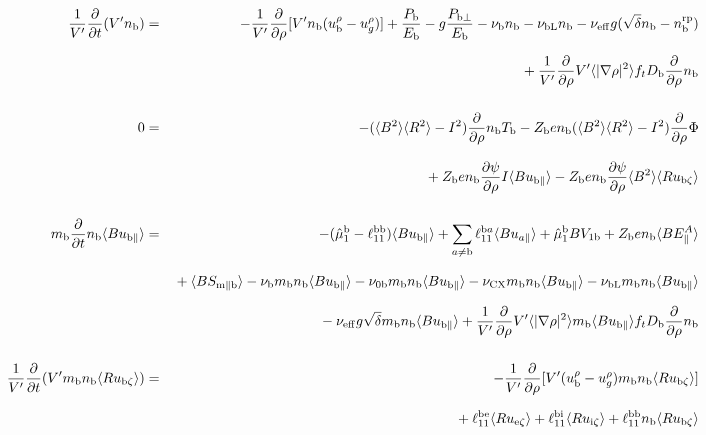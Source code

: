 \documentclass[11pt]{article}
\def\r#1{{\rm#1}}
\def\aves#1{\langle#1\rangle}
\def\dd#1#2{\frac{\partial #1}{\partial #2}}
\def\para{\parallel}
\def\ddrho{\frac{\partial}{\partial\rho}}
\def\ddV{\frac{\partial}{\partial V}}
\def\mb{m_\r{b}}
\def\ni{n_\r{i}}
\def\nb{n_\r{b}}
\def\Tb{T_\r{b}}
\def\Zb{Z_\r{b}}
\def\Pb{P_\r{b}}
\def\Eb{E_\r{b}}
\def\uezt{u_{\r{e}\zeta}}
\def\uizt{u_{\r{i}\zeta}}
\def\ubzt{u_{\r{b}\zeta}}
\def\ubpara{u_{\r{b}\para}}
\def\qhatepara{\hat{q}_{\r{e}\para}}
\def\qhatipara{\hat{q}_{\r{i}\para}}
\def\ubrho{u_\r{b}^\rho}
\def\ugrho{u_{g}^\rho}
\def\bri{\aves{B^2}\aves{R^2} - I^2}
\def\ddt{\frac{\partial}{\partial t}}
\def\nbrp{n_\r{b}^\r{rp}}
\def\Pbpara{P_{\r{b}\parallel}}
\def\Pbperp{P_{\r{b}\perp}}
\def\nueff{\nu_\r{eff}}
\def\Db{D_\r{b}}
\def\nunb{\nu_\r{0b}}
\def\nuCX{\nu_\r{CX}}
\def\nub{\nu_\r{b}}
\def\nubL{\nu_\r{bL}}
\def\red#1{\textcolor{red}{#1}}
\begin{document}
%
\begin{eqnarray}
  \frac{1}{V'} \ddt (V' \nb) &=&
%
  - \frac{1}{V'} \ddrho [ V' \nb (\ubrho - \ugrho) ]
%
  + \frac{\Pb}{\Eb}
%
  - g \frac{\Pbperp}{\Eb}
%
  - \nub \nb
%
  - \nubL \nb
%
  - \nueff g (\sqrt{\delta} \nb - \nbrp)
%
\nonumber\\[2.5mm]&&{}
  + \frac{1}{V'} \ddrho V'\aves{|\nabla\rho|^2} f_t \Db \ddrho \nb
%
\\[5mm]
  0 &=&
%
  -           ( \bri ) \ddrho \nb \Tb
%
  - \Zb e \nb ( \bri ) \ddrho \Phi
\nonumber\\[3mm]&&{}
%
  + \Zb e \nb \dd{\psi}{\rho} I          \aves{B\ubpara}
%
  - \Zb e \nb \dd{\psi}{\rho} \aves{B^2} \aves{R\ubzt}
\\[5mm]
  \mb \ddt \nb \aves{B \ubpara} &=&
%
  - (\hat{\mu}_1^\r{b} - \ell_{11}^\r{bb}) \aves{B \ubpara}
%
  + \sum_{a\neq\r{b}} \ell_{11}^{\r{b}a} \aves{B u_{a\para}}
%
  + \hat{\mu}_1^\r{b} {B V_{1\r{b}}}
%
  + \Zb e \nb \aves{B E_\para^A}
\nonumber\\[2.5mm]&&{}
%
  + \aves{B S_{\r{m}\para\r{b}}}
%
  - \nub  \mb \nb \aves{B\ubpara}
%
  - \nunb \mb \nb \aves{B\ubpara}
%
  - \nuCX \mb \nb \aves{B\ubpara}
%
%
  - \nubL \mb \nb \aves{B\ubpara}
%
\nonumber\\[2.5mm]&&{}
  - \nueff g \sqrt{\delta} \mb \nb \aves{B\ubpara}
%
  + \frac{1}{V'} \ddrho V' \aves{|\nabla\rho|^2} \mb \aves{B\ubpara} f_t \Db \ddrho \nb
\\[5mm]
  \frac{1}{V'} \ddt (V' \mb \nb \aves{R \ubzt}) &=&
%
  - \frac{1}{V'} \dd{}{\rho}[ V' (\ubrho - \ugrho) \mb \nb \aves{R \ubzt} ]
%
\nonumber\\[2.5mm]&&{}
%
  + \ell_{11}^\r{be} \aves{R \uezt}
  + \ell_{11}^\r{bi} \aves{R \uizt}
  + \ell_{11}^\r{bb} \nb \aves{R \ubzt}
\nonumber\\[2.5mm]&&{}
%

\end{eqnarray}
\end{document}
